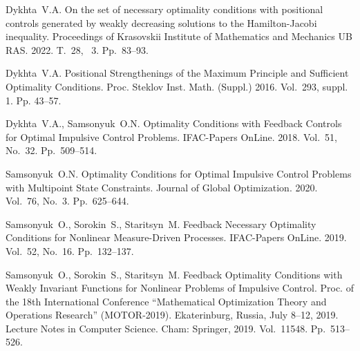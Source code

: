 \documentclass[12pt]{llncs}
\begin{document}
  

\begin{thebibliography}{9} 

 Dykhta~V.A. On the set of necessary optimality conditions with positional controls generated by weakly decreasing solutions to the Hamilton-Jacobi inequality. Proceedings of Krasovskii Institute of Mathematics and Mechanics UB RAS. 2022. T.~28, \textnumero~3. Pp.~83--93.

  Dykhta~V.A.  Positional Strengthenings of the Maximum Principle and Sufficient Optimality Conditions. Proc. Steklov Inst. Math. (Suppl.) 2016. Vol.~293, suppl. 1. Pp. 43--57.

Dykhta~V.A., Samsonyuk~O.N. 
Optimality Conditions with Feedback Controls for Optimal Impulsive Control Problems. 
IFAC-Papers OnLine. 2018. Vol.~51, No.~32. Pp.~509--514.

Samsonyuk~O.N. 
Optimality Conditions for Optimal Impulsive Control Problems with Multipoint State Constraints. Journal of Global Optimization. 2020. Vol.~76, No.~3. Pp.~625--644. 

Samsonyuk~O., Sorokin~S., Staritsyn~M.
Feedback Necessary Optimality Conditions for Nonlinear Measure-Driven Processes. 
IFAC-Papers OnLine. 2019. Vol.~52, No.~16. Pp.~132--137.


Samsonyuk~O., Sorokin~S., Staritsyn~M.
Feedback Optimality Conditions with Weakly Invariant Functions for Nonlinear Problems of Impulsive  Control. Proc. of the 18th International Conference ``Mathematical Optimization Theory and Operations Research'' (MOTOR-2019). Ekaterinburg, Russia, July 8--12, 2019. Lecture Notes in Computer Science. Cham: Springer, 2019. Vol.~11548. 
Pp.~513--526.


\end{thebibliography}
\end{document}
